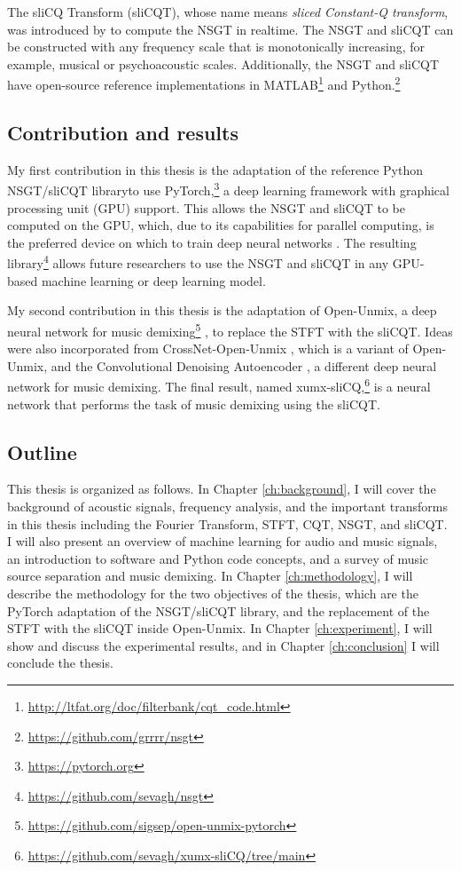 \documentclass[report.tex]{subfiles}
\begin{document}
The sliCQ Transform (sliCQT), whose name means \textit{sliced Constant-Q transform}, was introduced by \textcite{slicq} to compute the NSGT in realtime. The NSGT and sliCQT can be constructed with any frequency scale that is monotonically increasing, for example, musical or psychoacoustic scales. Additionally, the NSGT and sliCQT have open-source reference implementations in MATLAB\footnote{\url{http://ltfat.org/doc/filterbank/cqt_code.html}} and Python.\footnote{\label{grnsgt}\url{https://github.com/grrrr/nsgt}}

\subsection{Contribution and results}

My first contribution in this thesis is the adaptation of the reference Python NSGT/sliCQT library to use PyTorch,\footnote{\url{https://pytorch.org}} a deep learning framework with graphical processing unit (GPU) support. This allows the NSGT and sliCQT to be computed on the GPU, which, due to its capabilities for parallel computing, is the preferred device on which to train deep neural networks \parencite{pytorch}. The resulting library\footnote{\url{https://github.com/sevagh/nsgt}} allows future researchers to use the NSGT and sliCQT in any GPU-based machine learning or deep learning model.

My second contribution in this thesis is the adaptation of Open-Unmix, a deep neural network for music demixing\footnote{\url{https://github.com/sigsep/open-unmix-pytorch}} \parencite{umx}, to replace the STFT with the sliCQT. Ideas were also incorporated from CrossNet-Open-Unmix \parencite{xumx}, which is a variant of Open-Unmix, and the Convolutional Denoising Autoencoder \parencite{plumbley1}, a different deep neural network for music demixing. The final result, named xumx-sliCQ,\footnote{\url{https://github.com/sevagh/xumx-sliCQ/tree/main}} is a neural network that performs the task of music demixing using the sliCQT.

\subsection{Outline}

This thesis is organized as follows. In Chapter \ref{ch:background}, I will cover the background of acoustic signals, frequency analysis, and the important transforms in this thesis including the Fourier Transform, STFT, CQT, NSGT, and sliCQT. I will also present an overview of machine learning for audio and music signals, an introduction to software and Python code concepts, and a survey of music source separation and music demixing. In Chapter \ref{ch:methodology}, I will describe the methodology for the two objectives of the thesis, which are the PyTorch adaptation of the NSGT/sliCQT library, and the replacement of the STFT with the sliCQT inside Open-Unmix. In Chapter \ref{ch:experiment}, I will show and discuss the experimental results, and in Chapter \ref{ch:conclusion} I will conclude the thesis.
\end{document}

